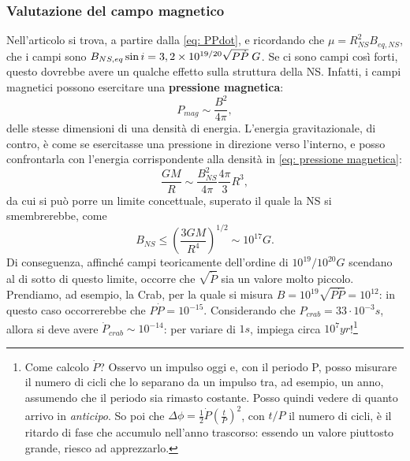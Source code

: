 \subsubsection{Valutazione del campo magnetico}
Nell'articolo \cite{Bhattacharya} si trova, a partire dalla \eqref{eq: PPdot}, e ricordando che $\mu = R^2_{NS}B_{eq,NS} $, che i campi sono $B_{NS,eq}\sin{i}=3,2\times10^{19/20}\sqrt{P\dot{P}} \hspace{1mm}G$.
Se ci sono campi così forti, questo dovrebbe avere un qualche effetto sulla struttura della NS. 
Infatti, i campi magnetici possono esercitare una \textbf{pressione magnetica}:
\begin{equation}
    P_{mag}\sim\frac{B^2}{4\pi},
    \label{eq: pressione magnetica}
\end{equation}
delle stesse dimensioni di una densità di energia.
L'energia gravitazionale, di contro,  è come se esercitasse una pressione in direzione verso l'interno, e posso confrontarla con l'energia corrispondente alla densità in \eqref{eq: pressione magnetica}:
\begin{equation}
    \frac{GM}{R}\sim\frac{B^2_{NS}}{4\pi}\frac{4\pi}{3}R^3,
\end{equation}
da cui si può porre un limite concettuale, superato il quale la NS si smembrerebbe, come
\begin{equation}
    B_{NS}\leq\left( \frac{3GM}{R^4} \right)^{1/2} \sim 10^{17}G.  
\end{equation}
Di conseguenza, affinché campi teoricamente dell'ordine di $10^{19}/10^{20}G$ scendano al di sotto di questo limite, occorre che $\sqrt{\dot{P}}$ sia un valore molto piccolo.
Prendiamo, ad esempio, la Crab, per la quale si misura $B=10^{19}\sqrt{P\dot{P}} = 10^{12} $: in questo caso occorrerebbe che $P\dot{P} = 10^{-15} $. Considerando che $P_{crab} = 33\cdot10^{-3}s$, allora si deve avere $\dot{P}_{crab}\sim10^{-14} $: per variare di $1s$, impiega circa $10^7yr$!\footnote{
Come calcolo $\dot{P}$?
Osservo un impulso oggi e, con il periodo P, posso misurare il numero di cicli che lo separano da un impulso tra, ad esempio, un anno, assumendo che il periodo sia rimasto costante. 
Posso quindi vedere di quanto arrivo in \textit{anticipo}.
So poi che $\Delta\phi = \frac{1}{2}\dot{P}\left(\frac{t}{P}\right)^2 $, con $t/P$ il numero di cicli, è il ritardo di fase che accumulo nell'anno trascorso: essendo un valore piuttosto grande, riesco ad apprezzarlo.
}
